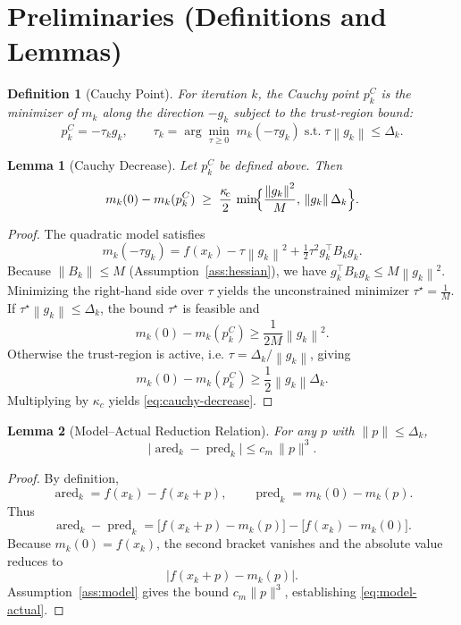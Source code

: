 \documentclass{article}
\newtheorem{lemma}{Lemma}
\newtheorem{definition}{Definition}
\newcommand{\norm}[1]{\left\lVert #1\right\rVert}
\begin{document}
\newpage
\section*{Preliminaries (Definitions and Lemmas)}
\begin{definition}[Cauchy Point]
For iteration $k$, the Cauchy point $p^{C}_{k}$ is the minimizer of $m_{k}$ along the direction $-g_{k}$ subject to the trust‑region bound:
\[
p^{C}_{k}= -\tau_{k} g_{k},\qquad 
\tau_{k}= \arg\min_{\tau\ge0}\; m_{k}(-\tau g_{k})\;\text{s.t.}\;\tau\norm{g_{k}}\le\Delta_{k}.
\]
\end{definition}

\begin{lemma}[Cauchy Decrease]\label{lem:cauchy}
Let $p^{C}_{k}$ be defined above. Then
\begin{equation}
\label{eq:cauchy-decrease}
m_{k}(0)-m_{k}(p^{C}_{k})\;\ge\;
\frac{\kappa_{\!c}}{2}\,\min\!\Bigl\{\frac{\norm{g_{k}}^{2}}{M},\,\norm{g_{k}}\Delta_{k}\Bigr\}.
\end{equation}
\end{lemma}
\begin{proof}
The quadratic model satisfies
\[
m_{k}(-\tau g_{k})=f(x_{k})-\tau\norm{g_{k}}^{2}+\tfrac12\tau^{2}g_{k}^{\top}B_{k}g_{k}.
\]
Because $\|B_{k}\|\le M$ (Assumption~\ref{ass:hessian}), we have $g_{k}^{\top}B_{k}g_{k}\le M\norm{g_{k}}^{2}$.  
Minimizing the right‑hand side over $\tau$ yields the unconstrained minimizer $\tau^{\star}= \frac{1}{M}$.  
If $\tau^{\star}\norm{g_{k}}\le\Delta_{k}$, the bound $\tau^{\star}$ is feasible and
\[
m_{k}(0)-m_{k}(p^{C}_{k})\ge
\frac{1}{2M}\norm{g_{k}}^{2}.
\]
Otherwise the trust‑region is active, i.e. $\tau=\Delta_{k}/\norm{g_{k}}$, giving
\[
m_{k}(0)-m_{k}(p^{C}_{k})\ge
\frac{1}{2}\norm{g_{k}}\Delta_{k}.
\]
Multiplying by $\kappa_{\!c}$ yields \eqref{eq:cauchy-decrease}. \hfill\qedsymbol
\end{proof}

\begin{lemma}[Model–Actual Reduction Relation]\label{lem:model-actual}
For any $p$ with $\|p\|\le\Delta_{k}$,
\begin{equation}
\label{eq:model-actual}
\bigl|\operatorname{ared}_{k}-\operatorname{pred}_{k}\bigr|
\le c_{m}\,\|p\|^{3}.
\end{equation}
\end{lemma}
\begin{proof}
By definition,
\[
\operatorname{ared}_{k}=f(x_{k})-f(x_{k}+p),\qquad
\operatorname{pred}_{k}=m_{k}(0)-m_{k}(p).
\]
Thus
\[
\operatorname{ared}_{k}-\operatorname{pred}_{k}
= \bigl[f(x_{k}+p)-m_{k}(p)\bigr]
   -\bigl[f(x_{k})-m_{k}(0)\bigr].
\]
Because $m_{k}(0)=f(x_{k})$, the second bracket vanishes and the absolute value reduces to
\[
\bigl|f(x_{k}+p)-m_{k}(p)\bigr|.
\]
Assumption~\ref{ass:model} gives the bound $c_{m}\|p\|^{3}$, establishing \eqref{eq:model-actual}. \hfill\qedsymbol
\end{proof}
\end{document}
